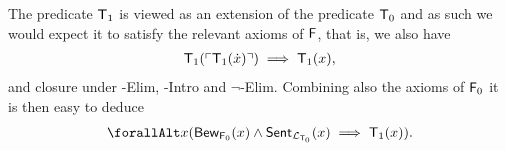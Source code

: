 \documentclass[UKenglish,cleveref,DIV=12]{scrartcl}
\let\forall\forallAlt
\theoremstyle{definition}
\theoremstyle{definition}
\begin{document}
The predicate $\mathsf{T}_1$ is viewed as an extension of the predicate $\mathsf{T}_0$ and as such
we would expect it to satisfy the relevant axioms of $\mathsf{F}$, that is, we also have %
\begin{gather*}%
 \T_1(\gn{\T_1(\dot x)})\implies \T_1(x),
\end{gather*}
and closure under -Elim, -Intro and $\lnot$-Elim. Combining
also the axioms of $\mathsf{F}_0$ it is then easy to deduce
\begin{align}\label{exteqn:F1reflection}
  \forall x( \Prov_{\F_0}(x)\land\Sent_{\L_{\T_0}}(x)\implies \T_1(x)).
\end{align}

\end{document}
